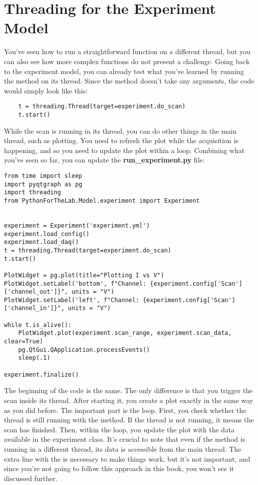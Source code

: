\section{Threading for the Experiment Model}\label{sec:threads-experiment-model}
You've seen how to run a straightforward function on a different thread, but you can also see how more complex functions do not present a challenge. Going back to the experiment model, you can already test what you've learned by running the  method on its thread. Since the method doesn't take any arguments, the code would simply look like this:

\begin{verbatim}
    t = threading.Thread(target=experiment.do_scan)
    t.start()
\end{verbatim}

While the scan is running in its thread, you can do other things in the main thread, such as plotting. You need to refresh the plot while the acquisition is happening, and so you need to update the plot within a loop. Combining what you've seen so far, you can update the \textbf{run\_experiment.py} file:

\begin{verbatim}
from time import sleep
import pyqtgraph as pg
import threading
from PythonForTheLab.Model.experiment import Experiment


experiment = Experiment('experiment.yml')
experiment.load_config()
experiment.load_daq()
t = threading.Thread(target=experiment.do_scan)
t.start()

PlotWidget = pg.plot(title="Plotting I vs V")
PlotWidget.setLabel('bottom', f"Channel: {experiment.config['Scan']['channel_out']}", units = "V")
PlotWidget.setLabel('left', f"Channel: {experiment.config['Scan']['channel_in']}", units = "V")

while t.is_alive():
    PlotWidget.plot(experiment.scan_range, experiment.scan_data, clear=True)
    pg.QtGui.QApplication.processEvents()
    sleep(.1)

experiment.finalize()
\end{verbatim}

The beginning of the code is the same. The only difference is that you trigger the scan inside its thread. After starting it, you create a plot exactly in the same way as you did before. The important part is the  loop. First, you check whether the thread is still running with the  method. If the thread is not running, it means the scan has finished. Then, within the loop, you update the plot with the data available in the experiment class. It's crucial to note that even if the  method is running in a different thread, its data is accessible from the main thread. The extra line with the  is necessary to make things work, but it's not important, and since you're not going to follow this approach in this book, you won't see it discussed further.

